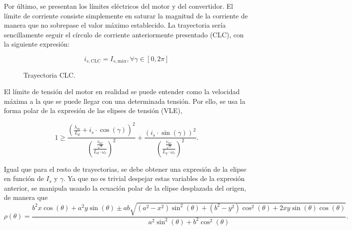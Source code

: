 Por último, se presentan los límites eléctricos del motor y del convertidor. El límite de corriente consiste simplemente en saturar la magnitud de la corriente de manera que no sobrepase el valor máximo establecido. La trayectoria sería sencillamente seguir el círculo de corriente anteriormente presentado (CLC), con la siguiente expresión:

\[
i_{s,\text{CLC}} = I_{s,\text{máx}} , \forall \gamma \in [0,2\pi]
\]


\begin{figure}[H]
  \centering
  \caption{Trayectoria CLC.}
\end{figure}


El límite de tensión del motor en realidad se puede entender como la velocidad máxima a la que se puede llegar con una determinada tensión. Por ello, se usa la forma polar de la expresión de las elipses de tensión (VLE),

\begin{equation}
1 \geq \frac{\left(\frac{\lambda_m}{L_d}+i_s \cdot \cos(\gamma)\right)^2}{\left(\frac{\frac{V_{\text{DC}}}{\sqrt{3}}}{L_d\cdot\omega_e}\right)^2}+\frac{(i_s \cdot \sin(\gamma))^2}{\left(\frac{\frac{V_{\text{DC}}}{\sqrt{3}}}{L_q\cdot\omega_e}\right)^2} \text{.}
\end{equation}

Igual que para el resto de trayectorias, se debe obtener una expresión de la elipse en función de $I_s$ y $\gamma$. Ya que no es trivial despejar estas variables de la expresión anterior, se manipula usando la ecuación polar de la elipse desplazada del origen, de manera que
\begin{equation}
\rho(\theta) = \frac{b^2 x \cos (\theta ) + a^2 y \sin (\theta )\pm a b \sqrt{\left(a^2-x^2\right) \sin ^2(\theta )+\left(b^2-y^2\right) \cos ^2(\theta )+2 x y \sin (\theta ) \cos (\theta )}}{a^2 \sin ^2(\theta )+b^2 \cos ^2(\theta )} \text{.}
\end{equation}

